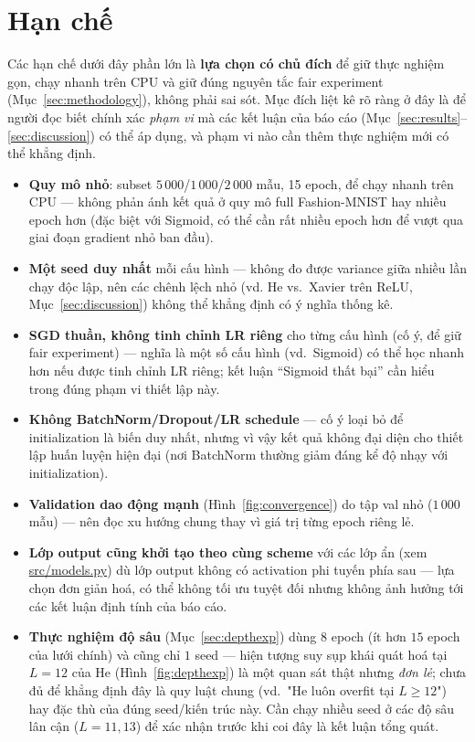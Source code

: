 \documentclass[12pt,a4paper]{report}
\begin{document}
\section{Hạn chế}
\label{sec:limitations}

Các hạn chế dưới đây phần lớn là \textbf{lựa chọn có chủ đích} để giữ thực
nghiệm gọn, chạy nhanh trên CPU và giữ đúng nguyên tắc fair experiment
(Mục~\ref{sec:methodology}), không phải sai sót. Mục đích liệt kê rõ ràng
ở đây là để người đọc biết chính xác \emph{phạm vi} mà các kết luận của
báo cáo (Mục~\ref{sec:results}--\ref{sec:discussion}) có thể áp dụng, và
phạm vi nào cần thêm thực nghiệm mới có thể khẳng định.

\begin{itemize}
\item \textbf{Quy mô nhỏ}: subset $5\,000$/$1\,000$/$2\,000$ mẫu, 15
  epoch, để chạy nhanh trên CPU --- không phản ánh kết quả ở quy mô full
  Fashion-MNIST hay nhiều epoch hơn (đặc biệt với Sigmoid, có thể cần rất
  nhiều epoch hơn để vượt qua giai đoạn gradient nhỏ ban đầu).
\item \textbf{Một seed duy nhất} mỗi cấu hình --- không đo được
  variance giữa nhiều lần chạy độc lập, nên các chênh lệch nhỏ (vd. He vs.\
  Xavier trên ReLU, Mục~\ref{sec:discussion}) không thể khẳng định có ý
  nghĩa thống kê.
\item \textbf{SGD thuần, không tinh chỉnh LR riêng} cho từng cấu hình
  (cố ý, để giữ fair experiment) --- nghĩa là một số cấu hình (vd.\
  Sigmoid) có thể học nhanh hơn nếu được tinh chỉnh LR riêng; kết luận
  ``Sigmoid thất bại'' cần hiểu trong đúng phạm vi thiết lập này.
\item \textbf{Không BatchNorm/Dropout/LR schedule} --- cố ý loại bỏ để
  initialization là biến duy nhất, nhưng vì vậy kết quả không đại diện cho
  thiết lập huấn luyện hiện đại (nơi BatchNorm thường giảm đáng kể độ nhạy
  với initialization).
\item \textbf{Validation dao động mạnh} (Hình~\ref{fig:convergence}) do
  tập val nhỏ ($1\,000$ mẫu) --- nên đọc xu hướng chung thay vì giá trị
  từng epoch riêng lẻ.
\item \textbf{Lớp output cũng khởi tạo theo cùng scheme} với các lớp ẩn
  (xem \url{src/models.py}) dù lớp output không có activation phi tuyến
  phía sau --- lựa chọn đơn giản hoá, có thể không tối ưu tuyệt đối nhưng
  không ảnh hưởng tới các kết luận định tính của báo cáo.
\item \textbf{Thực nghiệm độ sâu} (Mục~\ref{sec:depthexp}) dùng $8$ epoch
  (ít hơn $15$ epoch của lưới chính) và cũng chỉ $1$ seed --- hiện tượng
  suy sụp khái quát hoá tại $L{=}12$ của He (Hình~\ref{fig:depthexp}) là
  một quan sát thật nhưng \emph{đơn lẻ}; chưa đủ để khẳng định đây là quy
  luật chung (vd.\ "He luôn overfit tại $L\ge12$") hay đặc thù của đúng
  seed/kiến trúc này. Cần chạy nhiều seed ở các độ sâu lân cận
  ($L{=}11,13$) để xác nhận trước khi coi đây là kết luận tổng quát.
\end{itemize}
\end{document}
